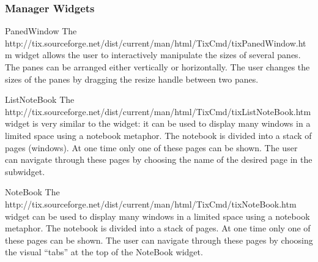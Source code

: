 


\subsubsection{Manager Widgets}

\begin{classdesc}{PanedWindow}{}
The 
{http://tix.sourceforge.net/dist/current/man/html/TixCmd/tixPanedWindow.htm}
widget allows the user to interactively manipulate the sizes of
several panes.  The panes can be arranged either vertically or
horizontally.  The user changes the sizes of the panes by dragging the
resize handle between two panes.
\end{classdesc}


\begin{classdesc}{ListNoteBook}{}
The 
{http://tix.sourceforge.net/dist/current/man/html/TixCmd/tixListNoteBook.htm}
widget is very similar to the  widget: it can be
used to display many windows in a limited space using a notebook
metaphor. The notebook is divided into a stack of pages (windows). At
one time only one of these pages can be shown. The user can navigate
through these pages by choosing the name of the desired page in the
 subwidget.
\end{classdesc}


\begin{classdesc}{NoteBook}{}
The 
{http://tix.sourceforge.net/dist/current/man/html/TixCmd/tixNoteBook.htm}
widget can be used to display many windows in a limited space using a
notebook metaphor. The notebook is divided into a stack of pages. At
one time only one of these pages can be shown. The user can navigate
through these pages by choosing the visual ``tabs'' at the top of the
NoteBook widget.
\end{classdesc}

